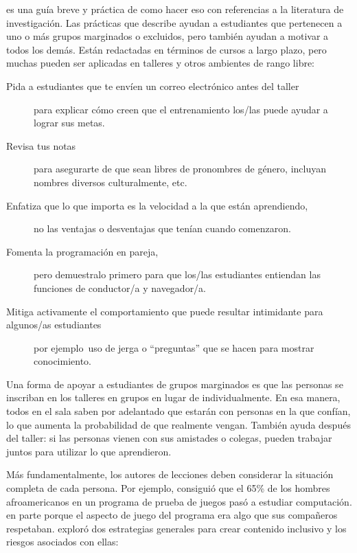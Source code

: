 \cite{Lee2017} es una guía breve y práctica de como hacer eso con referencias a la literatura de investigación.
Las prácticas que describe ayudan a estudiantes que pertenecen a uno o más grupos marginados o excluidos,
pero también ayudan a motivar a todos los demás.
Están redactadas en términos de cursos a largo plazo,
pero muchas pueden ser aplicadas en talleres y otros ambientes de rango libre:

\begin{description}

\item[Pida a estudiantes que te envíen un correo electrónico antes del taller]
  para explicar cómo creen que el entrenamiento los/las puede ayudar a lograr sus metas.

\item[Revisa tus notas]
  para asegurarte de que sean libres de pronombres de género, incluyan nombres diversos culturalmente, etc.

\item[Enfatiza que lo que importa es la velocidad a la que están aprendiendo,]
  no las ventajas o desventajas que tenían cuando comenzaron.

\item[Fomenta la programación en pareja,]
  pero demuestralo primero para que los/las estudiantes entiendan las funciones de conductor/a y navegador/a.

\item[Mitiga activamente el comportamiento que puede resultar intimidante para algunos/as estudiantes]
  por ejemplo\ uso de jerga o ``preguntas'' que se hacen para mostrar conocimiento.

\end{description}

Una forma de apoyar a estudiantes de grupos marginados es
que las personas se inscriban en los talleres en grupos en lugar de individualmente.
En esa manera,
todos en el sala saben por adelantado que estarán con personas en la que confían,
lo que aumenta la probabilidad de que realmente vengan.
También ayuda después del taller:
si las personas vienen con sus amistades o colegas,
pueden trabajar juntos para utilizar lo que aprendieron.

Más fundamentalmente,
los autores de lecciones deben considerar la situación completa de cada persona.
Por ejemplo,
\cite{DiSa2014a} consiguió que el 65\% de los hombres afroamericanos en un programa de prueba de juegos pasó a estudiar computación.
en parte porque el aspecto de juego del programa era algo que sus compañeros respetaban.
\cite{Lach2018} exploró dos estrategias generales para crear contenido inclusivo y los riesgos asociados con ellas:

